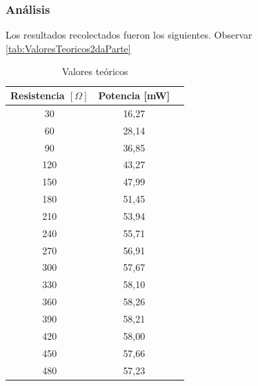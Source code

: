\documentclass{article}
\begin{document}
            
            
            \subsubsection{Análisis}
                \quad Los resultados recolectados fueron los siguientes. Observar \autoref{tab:ValoresTeoricos2daParte}

            \begin{table}[h!]
            \centering
                \begin{tabular}{|c|c|c|}
                \hline
                Resistencia  $[\Omega]$     & Potencia [mW]         \\ \hline
                30                          & 16,27                 \\ \hline
                60                          & 28,14                 \\ \hline
                90                          & 36,85                 \\ \hline
                120                         & 43,27                 \\ \hline
                150                         & 47,99                 \\ \hline
                180                         & 51,45                 \\ \hline
                210                         & 53,94                 \\ \hline
                240                         & 55,71                 \\ \hline
                270                         & 56,91                 \\ \hline
                300                         & 57,67                 \\ \hline
                330                         & 58,10                 \\ \hline
                360                         & 58,26                 \\ \hline
                390                         & 58,21                 \\ \hline
                420                         & 58,00                 \\ \hline
                450                         & 57,66                 \\ \hline
                480                         & 57,23                 \\ \hline
                \end{tabular}
            \caption{Valores teóricos}
            \label{tab:ValoresTeoricos2daParte}
            \end{table}
\end{document}
